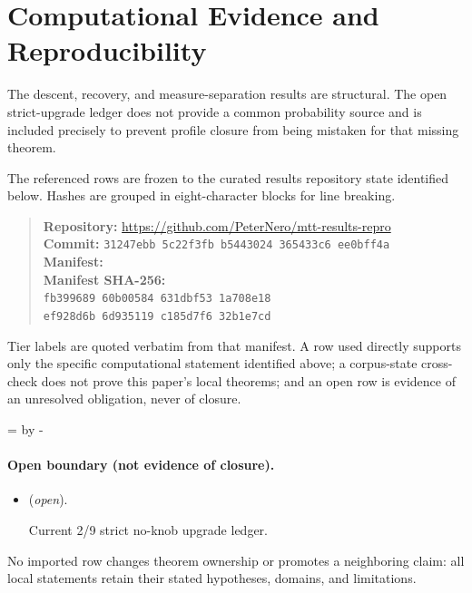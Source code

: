 \documentclass[11pt]{article}
\begin{document}
\section*{Computational Evidence and Reproducibility}
The descent, recovery, and measure-separation results are structural. The open strict-upgrade ledger does not provide a common probability source and is included precisely to prevent profile closure from being mistaken for that missing theorem.

The referenced rows are frozen to the curated results repository state identified below. Hashes are grouped in eight-character blocks for line breaking.
\begin{quote}\small
\textbf{Repository:} \url{https://github.com/PeterNero/mtt-results-repro}\\
\textbf{Commit:} \texttt{31247ebb 5c22f3fb b5443024 365433c6 ee0bff4a}\\
\textbf{Manifest:} \\
\textbf{Manifest SHA-256:}\\
\texttt{fb399689 60b00584 631dbf53 1a708e18}\\
\texttt{ef928d6b 6d935119 c185d7f6 32b1e7cd}
\end{quote}

Tier labels are quoted verbatim from that manifest. A row used directly supports only the specific computational statement identified above; a corpus-state cross-check does not prove this paper's local theorems; and an open row is evidence of an unresolved obligation, never of closure.

\par\begingroup{}=\pagegoal\advance{} by -\pagetotal\ifdim\dimen0<7\baselineskip\newpage\fi\endgroup
\paragraph{Open boundary (not evidence of closure).}
\begin{itemize}
\setlength{\itemsep}{0.25em}
\item {} (\emph{open}).\par Current 2/9 strict no-knob upgrade ledger.
\end{itemize}

No imported row changes theorem ownership or promotes a neighboring claim: all local statements retain their stated hypotheses, domains, and limitations.
\end{document}
